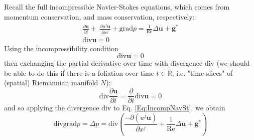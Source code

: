 \documentclass[10pt]{amsart}
\begin{document}
\begin{multicols*}{2}
Recall the full incompressible Navier-Stokes equations, which comes from momentum conservation, and mass conservation, respectively:
\begin{equation}\label{Eq:IncompNavSt}
\begin{gathered}
	\frac{ \partial \mathbf{u}}{ \partial t} + \ \frac{ \partial u^j \mathbf{u}}{ \partial x^j} + \text{grad}p = \frac{1}{\text{Re}} \Delta \mathbf{u} + \mathbf{g}^*  \\
\text{div}\mathbf{u} = 0 
\end{gathered}
\end{equation}
Using the incompressibility condition 
\[
\text{div}\mathbf{u} = 0
\]
then exchanging the partial derivative over time with divergence $\text{div}$ (we should be able to do this if there is a foliation over time $t\in \mathbb{R}$, i.e. "time-slices" of (spatial) Riemannian manifold $N$):
\begin{equation}
	\text{div}\frac{\partial \mathbf{u} }{ \partial t} = \frac{ \partial }{ \partial t} \text{div} \mathbf{u} = 0 
\end{equation}
and so applying the divergence $\text{div}$ to Eq. \ref{Eq:IncompNavSt}, we obtain
\begin{equation}\label{Eq:IncompNavStdiv}
\text{div}\text{grad}p = \Delta p = \text{div} \left( \frac{ - \partial (u^j \mathbf{u} ) }{ \partial x^j} + \frac{1}{\text{Re}} \Delta \mathbf{u} + \mathbf{g}^* \right)
\end{equation}


\end{multicols*}
\end{document}
